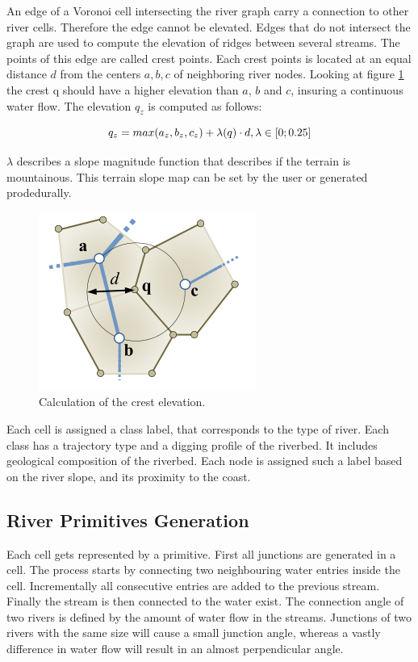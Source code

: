 An edge of a Voronoi cell intersecting the river graph carry a connection to other river cells. Therefore the edge cannot be elevated. Edges that do not intersect the graph are used to compute the elevation of ridges between several streams. The points of this edge are called crest points. Each crest points is located at an equal distance $d$ from the centers $a, b, c$ of neighboring river nodes. Looking at figure \ref{fig:crest} the crest q should have a higher elevation than $a$, $b$ and $c$, insuring a continuous water flow. The elevation $q_z$ is computed as follows: 

$$q_z = max(a_z, b_z, c_z) + \lambda(q) \cdot d, \\ \lambda \in [0; 0.25]$$ 

$\lambda$ describes a slope magnitude function that describes if the terrain is mountainous. This terrain slope map can be set by the user or generated prodedurally. 
\begin{figure}[htb]
	\centering
	\includegraphics[width=\linewidth]{GGG13/crest}
	\caption{Calculation of the crest elevation.}
	\label{fig:crest}
\end{figure}

Each cell is assigned a class label, that corresponds to the type of river. Each class has a trajectory type and a digging profile of the riverbed. It includes geological composition of the riverbed. Each node is assigned such a label based on the river slope, and its proximity to the coast. 

\subsection{River Primitives Generation}
Each cell gets represented by a primitive. First all junctions are generated in a cell. The process starts by connecting two neighbouring water entries inside the cell. Incrementally all consecutive entries are added to the previous stream. Finally the stream is then connected to the water exist. The connection angle of two rivers is defined by the amount of water flow in the streams. Junctions of two rivers with the same size will cause a small junction angle, whereas a vastly difference in water flow will result in an almost perpendicular angle. 

